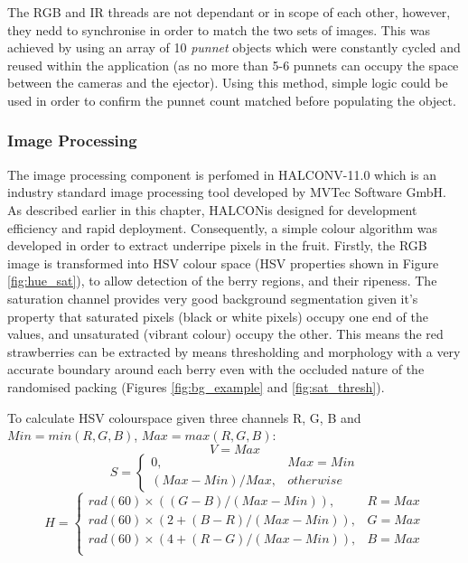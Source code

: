 \documentclass[fleqn,twoside,12pt]{report}
\begin{document}
The RGB and IR threads are not dependant or in scope of each other, however, they nedd to synchronise in order to match the two sets of images. This was achieved by using an array of 10 \textit{punnet} objects which were constantly cycled and reused within the application (as no more than 5-6 punnets can occupy the space between the cameras and the ejector). Using this method, simple logic could be used in order to confirm the punnet count matched before populating the object. 



\subsubsection{Image Processing}

The image processing component is perfomed in  HALCON\texttrademark V-11.0 which is an industry standard image processing tool developed by MVTec Software GmbH\texttrademark. As described earlier in this chapter, HALCON\texttrademark is designed for development efficiency and rapid deployment. Consequently, a simple colour algorithm was developed in order to extract underripe pixels in the fruit. Firstly, the RGB image is transformed into HSV colour space (HSV properties shown in Figure \ref{fig:hue_sat}), to allow detection of the berry regions, and their ripeness. The saturation channel provides very good background segmentation given it's property that saturated pixels (black or white pixels) occupy one end of the values, and unsaturated (vibrant colour) occupy the other. This means the red strawberries can be extracted by means thresholding and morphology with a very accurate boundary around each berry even with the occluded nature of the randomised packing (Figures \ref{fig:bg_example} and \ref{fig:sat_thresh}).

To calculate HSV colourspace given three channels R, G, B and $Min = min(R, G, B)$, $Max = max(R, G, B)$:
\begin{equation}
	V = Max
\end{equation}
\begin{equation}
	S = 
	\begin{cases} 
		0, & Max=Min \\   
		(Max-Min)/Max, & otherwise        
	\end{cases}
\end{equation}
\begin{equation}
H = 
\begin{cases} 
rad(60) \times ((G-B)/(Max-Min)), & R=Max \\
rad(60) \times (2 + (B-R)/(Max-Min)), & G=Max \\
rad(60) \times (4 + (R-G)/(Max-Min)), & B=Max \\   
\end{cases}
\end{equation}
\end{document}
